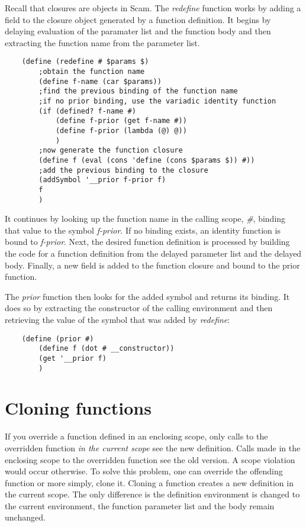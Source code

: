Recall that closures are objects in Scam.
The {\it redefine} function works by adding a field to the closure
object generated by a function definition. It begins by
delaying evaluation of the paramater list and the function
body and then extracting the function name from the parameter list.

\begin{verbatim}
    (define (redefine # $params $)
        ;obtain the function name
        (define f-name (car $params))
        ;find the previous binding of the function name
        ;if no prior binding, use the variadic identity function 
        (if (defined? f-name #)
            (define f-prior (get f-name #))
            (define f-prior (lambda (@) @))
            )
        ;now generate the function closure
        (define f (eval (cons 'define (cons $params $)) #))
        ;add the previous binding to the closure
        (addSymbol '__prior f-prior f)
        f
        )
\end{verbatim}

It continues by looking up the function name in the calling scope, {\it \#},
binding that value to the symbol {\it f-prior}. If no binding exists,
an identity function is bound to {\it f-prior}.
Next, the desired function definition is processed by building
the code for a function definition from the delayed parameter list
and the delayed body.
Finally, a new field is added to the function closure and bound
to the prior function.

The {\it prior} function then looks for the added symbol and returns
its binding. It does so by extracting the constructor of the calling
environment and then retrieving the value of the symbol that was 
added by {\it redefine}:

\begin{verbatim}
    (define (prior #)
        (define f (dot # __constructor))
        (get '__prior f)
        )
\end{verbatim}

\section{Cloning functions}

If you override a function defined in an enclosing scope, only calls
to
the overridden function {\it in the current scope} see the new definition.
Calls made in the enclosing scope to the overridden function
see the old version. A scope violation would occur otherwise.
To solve this problem, one can override the offending function
or more simply, clone it. Cloning a function creates a new
definition in the current scope. The only difference is the
definition environment is changed to the current environment,
the function parameter list and the body remain unchanged.

